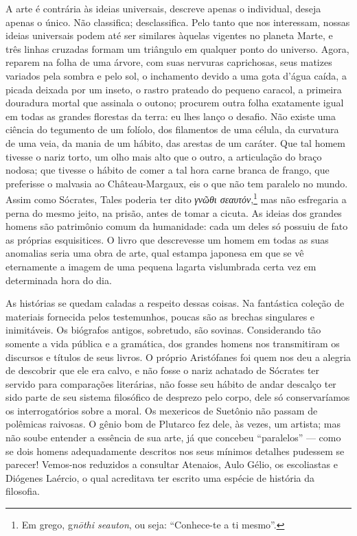 A arte é contrária às ideias universais, descreve apenas o
individual, deseja apenas o único. Não classifica; desclassifica. Pelo
tanto que nos interessam, nossas ideias universais podem até ser
similares àquelas vigentes no planeta Marte, e três linhas
cruzadas formam um triângulo em qualquer ponto do universo. Agora, reparem
na folha de uma árvore, com suas nervuras caprichosas, seus matizes
variados pela sombra e pelo sol, o inchamento devido a uma gota d’água
caída, a picada deixada por um inseto, o rastro prateado do pequeno
caracol, a primeira douradura mortal que assinala o outono; procurem outra
folha exatamente igual em todas as grandes florestas da terra: eu lhes
lanço o desafio. Não existe uma ciência do tegumento de um folíolo, dos
filamentos de uma célula, da curvatura de uma veia, da mania de um hábito,
das arestas de um caráter. Que tal homem tivesse o nariz torto, um olho
mais alto que o outro, a articulação do braço nodosa; que tivesse o hábito
de comer a tal hora carne branca de frango, que preferisse o malvasia ao
Château-Margaux, eis o que não tem paralelo no mundo. Assim como Sócrates,
Tales poderia ter dito \textit{γνῶθι σεαυτόν},\footnote{ Em grego, g\textit{n\=othi seauton}, ou
seja: ``Conhece-te a ti mesmo''.} mas não esfregaria
a perna do mesmo jeito, na prisão, antes de tomar a cicuta. As ideias dos
grandes homens são patrimônio comum da humanidade: cada um deles só
possuiu de fato as próprias esquisitices. O livro que descrevesse um homem
em todas as suas anomalias seria uma obra de arte, qual estampa japonesa
em que se vê eternamente a imagem de uma pequena lagarta vislumbrada certa
vez em determinada hora do dia.

As histórias se quedam caladas a respeito dessas coisas. Na fantástica
coleção de materiais fornecida pelos testemunhos, poucas são as brechas
singulares e inimitáveis. Os biógrafos antigos, sobretudo, são sovinas.
Considerando tão somente a vida pública e a gramática, dos grandes homens
nos transmitiram os discursos e títulos de seus livros. O próprio
Aristófanes foi quem nos deu a alegria de descobrir que ele era calvo, e
não fosse o nariz achatado de Sócrates ter servido para comparações
literárias, não fosse seu hábito de andar descalço ter sido parte de seu
sistema filosófico de desprezo pelo corpo, dele só conservaríamos os
interrogatórios sobre a moral. Os mexericos de Suetônio não passam de
polêmicas raivosas. O gênio bom de Plutarco fez dele, às vezes, um
artista; mas não soube entender a essência de sua arte, já que concebeu
“paralelos” --- como se dois homens adequadamente descritos nos seus mínimos
detalhes pudessem se parecer! Vemos-nos reduzidos a consultar Atenaios,
Aulo Gélio, os escoliastas e Diógenes Laércio, o qual acreditava ter
escrito uma espécie de história da filosofia.

